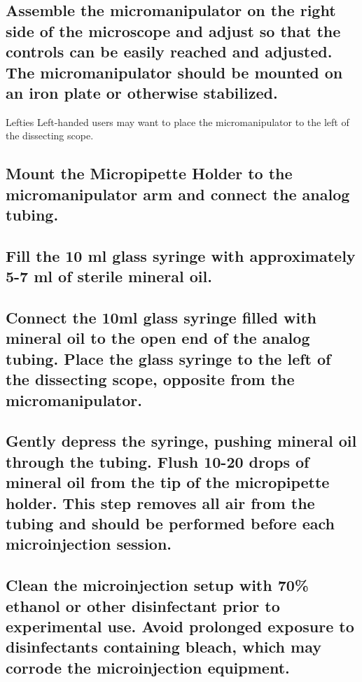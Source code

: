 \documentclass[11pt]{article}
\begin{document}
\subsection{{\sffamily } Assemble the micromanipulator on the right side of the microscope and adjust so that the controls can be easily reached and adjusted. The micromanipulator should be mounted on an iron plate or otherwise stabilized.}
\label{sec:orgheadline4}
\begin{bclogo}[logo=\bcinfo, couleurBarre=Black, noborder=true, couleur=gray!10]{     Lefties}
Left-handed users may want to place the micromanipulator to the left of the dissecting scope.\\
\end{bclogo}
\subsection{{\sffamily } Mount the Micropipette Holder to the micromanipulator arm and connect the analog tubing.}
\label{sec:orgheadline5}
\subsection{{\sffamily } Fill the 10 ml glass syringe with approximately 5-7 ml of sterile mineral oil.}
\label{sec:orgheadline6}
\subsection{{\sffamily } Connect the 10ml glass syringe filled with mineral oil to the open end of the analog tubing. Place the glass syringe to the left of the dissecting scope, opposite from the micromanipulator.}
\label{sec:orgheadline7}
\subsection{{\sffamily } Gently depress the syringe, pushing mineral oil through the tubing. Flush 10-20 drops of mineral oil from the tip of the micropipette holder. This step removes all air from the tubing and should be performed before each microinjection session.}
\label{sec:orgheadline8}
\subsection{{\sffamily } Clean the microinjection setup with 70\% ethanol or other disinfectant prior to experimental use. Avoid prolonged exposure to disinfectants containing bleach, which may corrode the microinjection equipment.}
\label{sec:orgheadline9}
\end{document}
